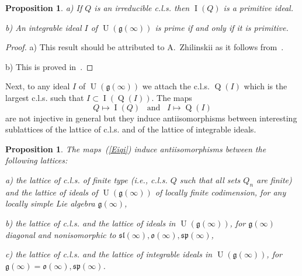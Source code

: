 \documentclass{emsprocart}
\newtheorem{lemma}[theorem]{Lemma}
\newtheorem{proposition}[theorem]{Proposition}
\begin{document}
\begin{proposition}\label{P44} a) If $Q$ is an irreducible c.l.s. then $\operatorname{I}(Q)$ is a primitive ideal.

b) \label{Lprpr} An integrable ideal $I$ of $\operatorname{U}(\mathfrak g(\infty))$ is prime if and only if it is primitive.
\end{proposition}
\begin{proof} a) This result should be attributed to A.~Zhilinskii as it follows from~\cite[Lemma 1.1.2]{Zh1}.

b) This is proved in~\cite[Proposition 7.8]{PP1}.
\end{proof}
Next, to any ideal $I$ of $\operatorname{U}(\mathfrak g(\infty))$ we attach the c.l.s. $\operatorname{Q}(I)$ which is the largest c.l.s. such that $I\subset \operatorname{I}(\operatorname{Q}(I))$. The maps \begin{equation}Q\mapsto \operatorname{I}(Q)\hspace{10pt}\mbox{and}\hspace{10pt}I\mapsto \operatorname{Q}(I)\label{Eiqi}\end{equation} are not injective in general but they induce antiisomorphisms between interesting sublattices of the lattice of c.l.s. and of the lattice of integrable ideals.
\begin{proposition}\label{P44C}The maps~(\ref{Eiqi}) induce antiisomorphisms between the following lattices:

a) the lattice of c.l.s. of {\it finite type} (i.e., c.l.s. $Q$ such that all sets $Q_n$ are finite) and the lattice of ideals of $\operatorname{U}(\mathfrak g(\infty))$ of locally finite codimension, for any locally simple Lie algebra $\mathfrak g(\infty)$,


b) the lattice of c.l.s. and the lattice of ideals in $\operatorname{U}(\mathfrak g(\infty))$, for $\mathfrak g(\infty)$ diagonal and nonisomorphic to $\mathfrak{sl}(\infty), \mathfrak o(\infty), \mathfrak{sp}(\infty)$,

c) the lattice of c.l.s. and the lattice of integrable ideals in $\operatorname{U}(\mathfrak g(\infty))$, for $\mathfrak g(\infty)=\mathfrak o(\infty), \mathfrak{sp}(\infty)$.

\end{proposition}
\end{document}
